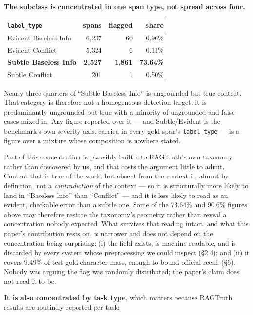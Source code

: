 \documentclass[11pt]{article}
\newcounter{none}
\begin{document}
\textbf{The subclass is concentrated in one span type, not spread across four.}

{\def\LTcaptype{none} %
\begin{longtable}[]{@{}lrrr@{}}
\toprule\noalign{}
\texttt{label\_type} & spans & flagged & share \\
\midrule\noalign{}
\endhead
\bottomrule\noalign{}
\endlastfoot
Evident Baseless Info & 6,237 & 60 & 0.96\% \\
Evident Conflict & 5,324 & 6 & 0.11\% \\
\textbf{Subtle Baseless Info} & \textbf{2,527} & \textbf{1,861} & \textbf{73.64\%} \\
Subtle Conflict & 201 & 1 & 0.50\% \\
\end{longtable}
}

Nearly three quarters of ``Subtle Baseless Info'' is ungrounded-but-true content. That
category is therefore not a homogeneous detection target: it is predominantly
ungrounded-but-true with a minority of ungrounded-and-false cases mixed in. Any figure reported
over it --- and Subtle/Evident is the benchmark's own severity axis, carried in every gold
span's \texttt{label\_type} --- is a figure over a mixture whose composition is nowhere stated.

Part of this concentration is plausibly built into RAGTruth's own taxonomy rather than
discovered by us, and that costs the argument little to admit. Content that is true of the
world but absent from the context is, almost by definition, not a \emph{contradiction} of the
context --- so it is structurally more likely to land in ``Baseless Info'' than ``Conflict'' --- and
it is less likely to read as an evident, checkable error than a subtle one. Some of the 73.64\%
and 90.6\% figures above may therefore restate the taxonomy's geometry rather than reveal a
concentration nobody expected. What survives that reading intact, and what this paper's
contribution rests on, is narrower and does not depend on the concentration being surprising:
(i) the field exists, is machine-readable, and is discarded by every system whose
preprocessing we could inspect (§2.4); and (ii) it covers 9.49\% of test gold character mass,
enough to bound official recall (§6). Nobody was arguing the flag was randomly distributed;
the paper's claim does not need it to be.

\textbf{It is also concentrated by task type}, which matters because RAGTruth results are
routinely reported per task:
\end{document}
